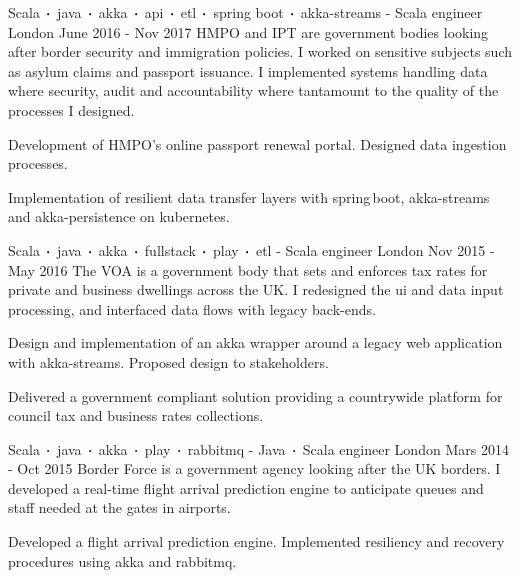 \begin{cventries}
    \cventry
    {Scala$\sqbig$java$\sqbig$akka$\sqbig$api$\sqbig$etl$\sqbig$spring boot$\sqbig$akka-streams}
    { - Scala engineer}
    {London}
    {June 2016 - Nov 2017}
    {HMPO and IPT are government bodies looking after border security and immigration policies. I worked on sensitive subjects such as asylum claims and passport issuance. I implemented systems handling data where security, audit and accountability where tantamount to the quality of the processes I designed.}
    {
        \begin{cvitems}
            \item{Development of HMPO's online passport renewal portal. Designed data ingestion processes.}
            \item{Implementation of resilient data transfer layers with spring\,boot, akka-streams and akka-persistence on kubernetes.}
        \end{cvitems}
    }

    \cventry
    {Scala$\sqbig$java$\sqbig$akka$\sqbig$fullstack$\sqbig$play$\sqbig$etl}
    { - Scala engineer}
    {London}
    {Nov 2015 - May 2016}
    {The VOA is a government body that sets and enforces tax rates for private and business dwellings across the UK. I redesigned the ui and data input processing, and interfaced data flows with legacy back-ends. }
    {
        \begin{cvitems}
            \item{Design and implementation of an akka wrapper around a legacy web application with akka-streams. Proposed design to stakeholders.}
            \item{Delivered a government compliant solution providing a countrywide platform for council tax and business rates collections.}
        \end{cvitems}
    }

    \cventry
    {Scala$\sqbig$java$\sqbig$akka$\sqbig$play$\sqbig$rabbitmq}
    { - Java$\sqbig$Scala engineer}
    {London}
    {Mars 2014 - Oct 2015}
    {Border Force is a government agency looking after the UK borders. I developed a real-time flight arrival prediction engine to anticipate queues and staff needed at the gates in airports.}
    {
        \begin{cvitems}
            \item{Developed a flight arrival prediction engine. Implemented resiliency and recovery procedures using akka and rabbitmq.}
        \end{cvitems}
    }


\end{cventries}

